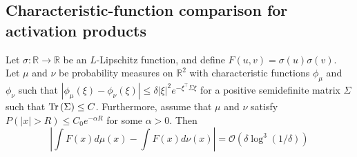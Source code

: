 \allowdisplaybreaks
\subsection{Characteristic-function comparison for activation products}\label{lemma:activ-prod}
\begin{lemma}
    Let $\sigma: \mathbb{R} \to \mathbb{R}$ be an $L$-Lipschitz function, and define $F(u, v) = \sigma(u)\sigma(v)$. Let $\mu$ and $\nu$ be probability measures on $\mathbb{R}^2$ with characteristic functions $\phi_\mu$ and $\phi_\nu$ such that $|\phi_\mu(\xi) - \phi_\nu(\xi)| \le \delta |\xi|^2 e^{-\xi^\top \Sigma\xi}$ for a positive semidefinite matrix $\Sigma$ such that $\operatorname{Tr}\left({\Sigma}\right) \leq C$. Furthermore, assume that $\mu$ and $\nu$ satisfy $P(|x| > R) \le C_0 e^{-\alpha R}$ for some $\alpha > 0$. Then
    \[
        \left| \int F(x) d\mu(x) - \int F(x) d\nu(x) \right| = \mathcal{O}\left(\delta \log^3(1/\delta)\right)
    \]
\end{lemma}

